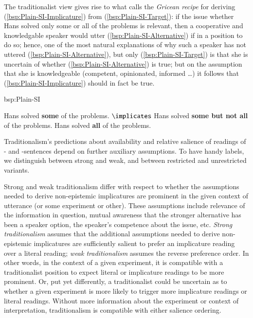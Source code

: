 \documentclass[fleqn,reqno,10pt]{article}
\newcommand{\as}{\acro{as}}
\renewcommand{\es}{\acro{es}}
\renewcommand{\mymark}[1]{\textbf{#1}}
\begin{document}
The traditionalist view gives rise to what
\citet{Geurts2010:Quantity-Implic} calls the \emph{Gricean recipe} for
deriving (\ref{bsp:Plain-SI-Implicature}) from
(\ref{bsp:Plain-SI-Target}): if the issue whether Hans solved only
some or all of the problems is relevant, then a cooperative and
knowledgable speaker would utter (\ref{bsp:Plain-SI-Alternative}) if
in a position to do so; hence, one of the most natural explanations of
why such a speaker has not uttered (\ref{bsp:Plain-SI-Alternative}),
but only (\ref{bsp:Plain-SI-Target}) is that she is uncertain of
whether (\ref{bsp:Plain-SI-Alternative}) is true; but on the
assumption that she is knowledgeable (competent, opinionated, informed
\dots) it follows that (\ref{bsp:Plain-SI-Implicature}) should in fact
be true.

\begin{exer}{bsp:Plain-SI}
  \ex 
    \begin{xlist}
      \ex \label{bsp:Plain-SI-Target} Hans solved \mymark{some} of the problems.
      \ex \label{bsp:Plain-SI-Implicature} $\implicates$ Hans solved
        \mymark{some but not all} of the problems.
      \ex  \label{bsp:Plain-SI-Alternative}  Hans solved \mymark{all} of the problems.
    \end{xlist}
\end{exer}

Traditionalism's predictions about availability and relative salience
of readings of \as- and \es-sentences depend on further auxiliary
assumptions. To have handy labels, we distinguish between strong and
weak, and between restricted and unrestricted variants.

Strong and weak traditionalism differ with respect to whether the
assumptions needed to derive non-epistemic implicatures are prominent
in the given context of utterance (or some experiment or other). These
assumptions include relevance of the information in question, mutual
awareness that the stronger alternative has been a speaker option, the
speaker's competence about the issue, etc. \emph{Strong
  traditionalism} assumes that the additional assumptions needed to
derive non-epistemic implicatures are sufficiently salient to prefer
an implicature reading over a literal reading; \emph{weak
  traditionalism} assumes the reverse preference order. In other
words, in the context of a given experiment, it is compatible with a
traditionalist position to expect literal or implicature readings to
be more prominent. Or, put yet differently, a traditionalist could be
uncertain as to whether a given experiment is more likely to trigger
more implicature readings or literal readings. Without more
information about the experiment or context of interpretation,
traditionalism is compatible with either salience ordering.
\end{document}
